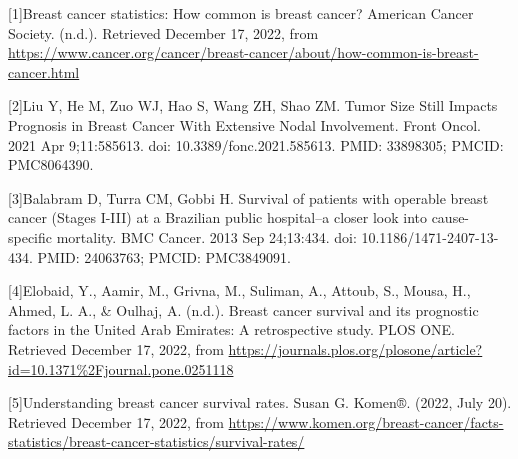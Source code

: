 \documentclass[
  12pt,
]{article}
\begin{document}
{[}1{]}Breast cancer statistics: How common is breast cancer? American
Cancer Society. (n.d.). Retrieved December 17, 2022, from
\url{https://www.cancer.org/cancer/breast-cancer/about/how-common-is-breast-cancer.html}

{[}2{]}Liu Y, He M, Zuo WJ, Hao S, Wang ZH, Shao ZM. Tumor Size Still
Impacts Prognosis in Breast Cancer With Extensive Nodal Involvement.
Front Oncol. 2021 Apr 9;11:585613. doi: 10.3389/fonc.2021.585613. PMID:
33898305; PMCID: PMC8064390.

{[}3{]}Balabram D, Turra CM, Gobbi H. Survival of patients with operable
breast cancer (Stages I-III) at a Brazilian public hospital--a closer
look into cause-specific mortality. BMC Cancer. 2013 Sep 24;13:434. doi:
10.1186/1471-2407-13-434. PMID: 24063763; PMCID: PMC3849091.

{[}4{]}Elobaid, Y., Aamir, M., Grivna, M., Suliman, A., Attoub, S.,
Mousa, H., Ahmed, L. A., \& Oulhaj, A. (n.d.). Breast cancer survival
and its prognostic factors in the United Arab Emirates: A retrospective
study. PLOS ONE. Retrieved December 17, 2022, from
\url{https://journals.plos.org/plosone/article?id=10.1371\%2Fjournal.pone.0251118}

{[}5{]}Understanding breast cancer survival rates. Susan G. Komen®.
(2022, July 20). Retrieved December 17, 2022, from
\url{https://www.komen.org/breast-cancer/facts-statistics/breast-cancer-statistics/survival-rates/}
\end{document}
